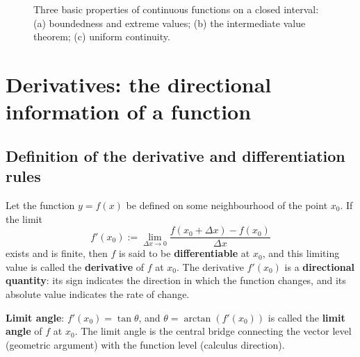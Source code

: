 \begin{figure}[htbp]
\caption{Three basic properties of continuous functions on a closed interval: (a) boundedness and extreme values; (b) the intermediate value theorem; (c) uniform continuity.}
\label{fig:closed_interval_continuity}
\end{figure}

\section{\texorpdfstring{Derivatives: the directional information of a function}{Derivatives: the directional information of a function}}

\subsection{\texorpdfstring{Definition of the derivative and differentiation rules}{Definition of the derivative and differentiation rules}}

\begin{definition}\label{def:derivative}
Let the function $y = f(x)$ be defined on some neighbourhood of the point $x_0$. If the limit
\[f'(x_0) := \lim_{\Delta x \to 0} \frac{f(x_0 + \Delta x) - f(x_0)}{\Delta x}\]
exists and is finite, then $f$ is said to be \textbf{differentiable} at $x_0$, and this limiting value is called the \textbf{derivative} of $f$ at $x_0$. The derivative $f'(x_0)$ is a \textbf{directional quantity}: its sign indicates the direction in which the function changes, and its absolute value indicates the rate of change.

\textbf{Limit angle}: $f'(x_0) = \tan\theta$, and $\theta = \arctan(f'(x_0))$ is called the \textbf{limit angle} of $f$ at $x_0$. The limit angle is the central bridge connecting the vector level (geometric argument) with the function level (calculus direction).
\end{definition}

